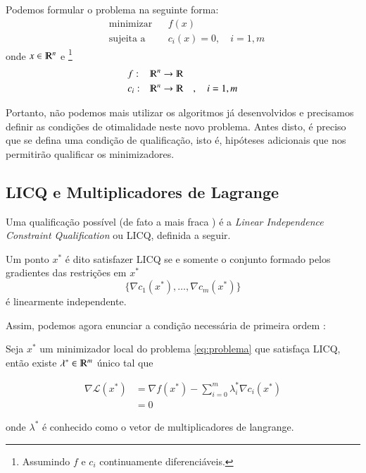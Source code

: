 Podemos formular o problema na seguinte forma:
\begin{equation}
    \label{eq:problema}
    \begin{aligned}
        & \text{minimizar} & & f(x) \\
        & \text{sujeita a} & & c_i(x) = 0, \quad i = 1, m
    \end{aligned}
\end{equation}
onde $x  \in \varmathbb{R}^n $ e \footnote{Assumindo $f$ e $c_i$ continuamente diferenciáveis.}
\begin{equation*}
    \begin{aligned}
        & f: & \varmathbb{R}^n \rightarrow \varmathbb{R} & &  \\
        & c_i: & \varmathbb{R}^n \rightarrow \varmathbb{R} & & ,\quad  i = 1, m
    \end{aligned}
\end{equation*}

Portanto, não podemos mais utilizar os algoritmos já desenvolvidos e precisamos
definir as condições de otimalidade neste novo problema. Antes disto, é preciso
que se defina uma condição de qualificação, isto é, hipóteses adicionais que nos
permitirão qualificar os minimizadores.

\newpage
\subsection{LICQ e Multiplicadores de Lagrange}
    Uma qualificação possível (de fato a mais fraca \citep{Wachsmuth201378}) é a
    \emph{Linear Independence Constraint Qualification} ou LICQ, definida a seguir.

    \begin{definition}
        Um ponto $x^*$ é dito satisfazer LICQ se e somente o conjunto formado pelos
        gradientes das restrições em $x^*$
        $$ \{ \nabla c_1(x^*), \dots, \nabla c_m(x^*)\} $$
        é linearmente independente.
    \end{definition}

    Assim, podemos agora enunciar a condição necessária de primeira ordem \citep{Friedlander94}:

    \begin{theorem}
        Seja $x^*$ um minimizador local do problema \ref{eq:problema} que satisfaça LICQ,
        então existe $\lambda^* \in \varmathbb{R}^m$ único tal que

        \begin{equation}
            \label{eq:parada}
            \begin{aligned}
                \nabla \mathcal{L}(x^*) &= \nabla f(x^*) - \sum_{i = 0}^{m} \lambda_i^* \nabla c_i(x^*) \\
                                      &= 0
            \end{aligned}
        \end{equation}

        onde $\lambda^*$ é conhecido como o vetor de multiplicadores de langrange.
    \end{theorem}

